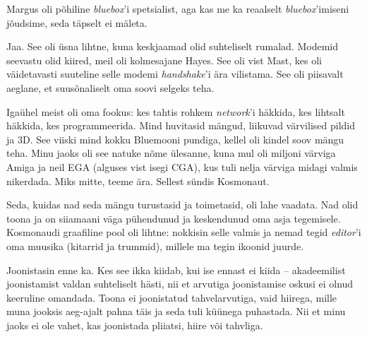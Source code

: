 Margus 
oli põhiline \emph{bluebox}'i spetsialist, aga kas me ka reaalselt 
\emph{bluebox}'imiseni jõudsime, seda täpselt ei mäleta.


Jaa. See oli üsna lihtne, kuna 
keskjaamad olid suhteliselt rumalad. Modemid seevastu olid kiired, meil oli 
kolmesajane Hayes. See oli vist
Mast, kes oli väidetavasti suuteline selle modemi 
\emph{handshake}'i ära vilistama. See oli 
piisavalt aeglane, et
suusõnaliselt oma soovi selgeks teha.

Igaühel meist oli oma fookus: kes tahtis rohkem 
\emph{network}'i häkkida, kes lihtsalt häkkida, kes 
programmeerida. Mind huvitasid mängud, liikuvad värvilised 
pildid ja 3D. See viiski mind kokku
Bluemooni pundiga, kellel oli kindel soov mängu 
teha. Minu jaoks oli see natuke nõme ülesanne, kuna 
mul oli miljoni värviga Amiga ja neil 
EGA (alguses vist isegi CGA), kus tuli nelja värviga 
midagi valmis nikerdada. Miks mitte, teeme ära. Sellest sündis 
Kosmonaut. 

Seda, kuidas nad seda mängu turustasid ja toimetasid, oli lahe vaadata. Nad 
olid toona ja on siiamaani väga pühendunud ja keskendunud oma asja 
tegemisele. Kosmonaudi graafiline pool oli lihtne: nokkisin selle valmis ja 
nemad tegid 
\emph{editor}'i oma muusika (kitarrid ja trummid), millele ma tegin ikoonid 
juurde.


Joonistasin enne ka. Kes see ikka kiidab, kui ise ennast ei kiida – 
akadeemilist joonistamist valdan suhteliselt hästi, nii et arvutiga 
joonistamise oskusi 
ei olnud keeruline omandada. Toona ei joonistatud tahvelarvutiga,
vaid hiirega, mille muna jooksis aeg-ajalt pahna täis ja seda tuli
küünega puhastada. Nii et minu jaoks ei ole vahet, kas joonistada
pliiatsi, hiire või tahvliga.

